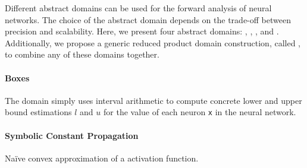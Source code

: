 Different abstract domains can be used for the forward analysis of neural networks.
The choice of the abstract domain depends on the trade-off between precision and scalability.
Here, we present four abstract domains: \boxes{} \cite{Cousot1976,Hickey2001}, \symbolic{} \cite{Li2019,Min_e2006b}, \deeppoly{} \cite{Singh2019}, and \neurify{} \cite{Wang2018}. Additionally, we propose a generic reduced product domain construction, called \reducedproduct, to combine any of these domains together.


\paragraph{Boxes}


The \boxes{} domain simply uses interval arithmetic  to compute concrete lower and upper bound estimations $l$ and $u$ for the value of each neuron \texttt{x} in the neural network.


\paragraph{Symbolic Constant Propagation}

\begin{marginfigure}
  \caption{Na\"ive convex approximation of a \relu{} activation function.}
\end{marginfigure}

